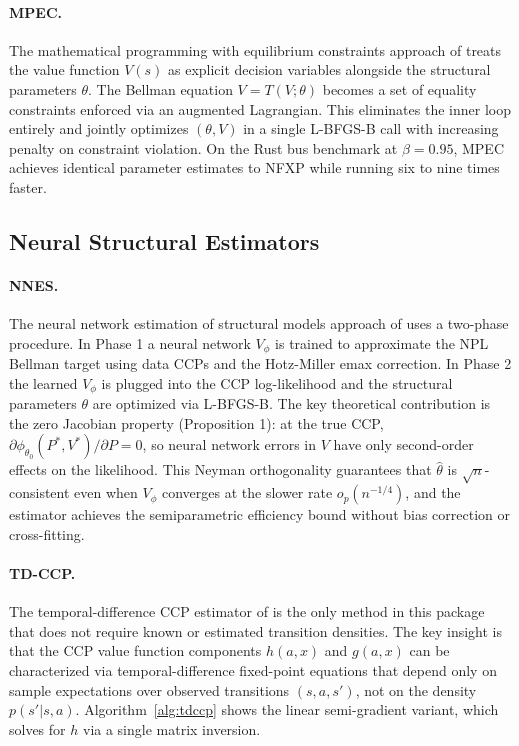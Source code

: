 \paragraph{MPEC.}
The mathematical programming with equilibrium constraints approach of \citet{suJudd2012} treats the value function $V(s)$ as explicit decision variables alongside the structural parameters $\theta$.
The Bellman equation $V = T(V;\theta)$ becomes a set of equality constraints enforced via an augmented Lagrangian.
This eliminates the inner loop entirely and jointly optimizes $(\theta, V)$ in a single L-BFGS-B call with increasing penalty on constraint violation.
On the Rust bus benchmark at $\beta = 0.95$, MPEC achieves identical parameter estimates to NFXP while running six to nine times faster.


\subsection{Neural Structural Estimators}

\paragraph{NNES.}
The neural network estimation of structural models approach of \citet{nguyen2025} uses a two-phase procedure.
In Phase 1 a neural network $V_\phi$ is trained to approximate the NPL Bellman target using data CCPs and the Hotz-Miller emax correction.
In Phase 2 the learned $V_\phi$ is plugged into the CCP log-likelihood and the structural parameters $\theta$ are optimized via L-BFGS-B.
The key theoretical contribution is the zero Jacobian property (Proposition 1): at the true CCP, $\partial \phi_{\theta_0}(P^*, V^*)/\partial P = 0$, so neural network errors in $V$ have only second-order effects on the likelihood.
This Neyman orthogonality guarantees that $\hat\theta$ is $\sqrt{n}$-consistent even when $V_\phi$ converges at the slower rate $o_p(n^{-1/4})$, and the estimator achieves the semiparametric efficiency bound without bias correction or cross-fitting.

\paragraph{TD-CCP.}
The temporal-difference CCP estimator of \citet{adusumilliEckardt2025} is the only method in this package that does not require known or estimated transition densities.
The key insight is that the CCP value function components $h(a,x)$ and $g(a,x)$ can be characterized via temporal-difference fixed-point equations that depend only on sample expectations over observed transitions $(s, a, s')$, not on the density $p(s'|s,a)$.
Algorithm~\ref{alg:tdccp} shows the linear semi-gradient variant, which solves for $h$ via a single matrix inversion.

